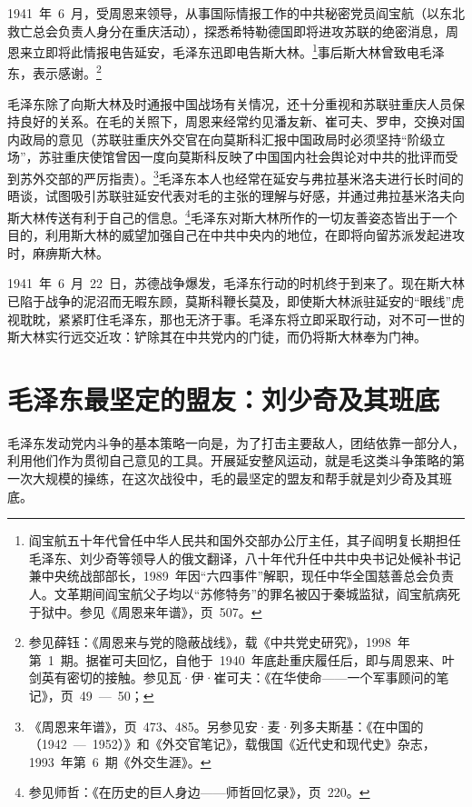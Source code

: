 1941~年~6~月，受周恩来领导，从事国际情报工作的中共秘密党员阎宝航（以东北救亡总会负责人身分在重庆活动），探悉希特勒德国即将进攻苏联的绝密消息，周恩来立即将此情报电告延安，毛泽东迅即电告斯大林。\footnote{阎宝航五十年代曾任中华人民共和国外交部办公厅主任，其子阎明复长期担任毛泽东、刘少奇等领导人的俄文翻译，八十年代升任中共中央书记处候补书记兼中央统战部部长，1989~年因“六四事件”解职，现任中华全国慈善总会负责人。文革期间阎宝航父子均以“苏修特务”的罪名被囚于秦城监狱，阎宝航病死于狱中。参见《周恩来年谱》，页~507。}事后斯大林曾致电毛泽东，表示感谢。\footnote{参见薛钰：《周恩来与党的隐蔽战线》，载《中共党史研究》，1998~年第~1~期。据崔可夫回忆，自他于~1940~年底赴重庆履任后，即与周恩来、叶剑英有密切的接触。参见瓦·伊·崔可夫：《在华使命——一个军事顾问的笔记》，页~49~—~50；}

毛泽东除了向斯大林及时通报中国战场有关情况，还十分重视和苏联驻重庆人员保持良好的关系。在毛的关照下，周恩来经常约见潘友新、崔可夫、罗申，交换对国内政局的意见（苏联驻重庆外交官在向莫斯科汇报中国政局时必须坚持“阶级立场”，苏驻重庆使馆曾因一度向莫斯科反映了中国国内社会舆论对中共的批评而受到苏外交部的严厉指责）。\footnote{《周恩来年谱》，页~473、485。另参见安·麦·列多夫斯基：《在中国的（1942~—~1952）》和《外交官笔记》，载俄国《近代史和现代史》杂志，1993~年第~6~期《外交生涯》。}毛泽东本人也经常在延安与弗拉基米洛夫进行长时间的晤谈，试图吸引苏联驻延安代表对毛的主张的理解与好感，并通过弗拉基米洛夫向斯大林传送有利于自己的信息。\footnote{参见师哲：《在历史的巨人身边——师哲回忆录》，页~220。}毛泽东对斯大林所作的一切友善姿态皆出于一个目的，利用斯大林的威望加强自己在中共中央内的地位，在即将向留苏派发起进攻时，麻痹斯大林。

1941~年~6~月~22~日，苏德战争爆发，毛泽东行动的时机终于到来了。现在斯大林已陷于战争的泥沼而无暇东顾，莫斯科鞭长莫及，即使斯大林派驻延安的“眼线”虎视耽眈，紧紧盯住毛泽东，那也无济于事。毛泽东将立即采取行动，对不可一世的斯大林实行远交近攻：铲除其在中共党内的门徒，而仍将斯大林奉为门神。

\section{毛泽东最坚定的盟友：刘少奇及其班底}

毛泽东发动党内斗争的基本策略一向是，为了打击主要敌人，团结依靠一部分人，利用他们作为贯彻自己意见的工具。开展延安整风运动，就是毛这类斗争策略的第一次大规模的操练，在这次战役中，毛的最坚定的盟友和帮手就是刘少奇及其班底。

